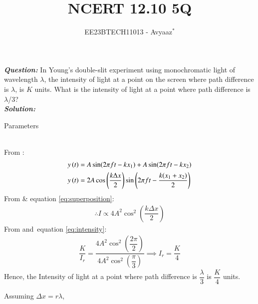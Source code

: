 \documentclass[journal,12pt,twocolumn]{IEEEtran}
\theoremstyle{remark}
\begin{document}

\vspace{3cm}

\title{NCERT 12.10 5Q}
\author{EE23BTECH11013 - Avyaaz$^{*}$%
}
\maketitle
\newpage
\bigskip

\renewcommand{\thefigure}{\arabic{figure}}
\renewcommand{\thetable}{\arabic{table}}

\large\textbf{\textsl{Question:}}
In Young’s double-slit experiment using monochromatic light of wavelength $\lambda$, the intensity of light at a point on the screen where path difference is $\lambda$, is $K$ units. What is the intensity of light at a
point where path difference is $\lambda$/3?\\
\large\textbf{\textsl{Solution:}}
\begin{table}[htbp]
\setlength{\extrarowheight}{8pt}
\centering

\vspace{0.2cm}
\caption{Parameters}
\label{tab:parameters}
\end{table}\\
From :
\begin{align}
y\left(t\right) &= A\sin({2\pi f t - kx_1})  + A\sin({ 2\pi f t - kx_2}) \\
y\left(t\right) &=  2A\cos\left(\dfrac{k\Delta x}{2}\right)\sin\left(2\pi f t - \dfrac{k(x_1+x_2)}{2} \right) \label{eq:superposition}
\end{align}
From  \&  equation \eqref{eq:superposition}: 
\begin{align}
\therefore I \propto 4A^2\cos^2\left(\dfrac{k\Delta x}{2}\right)  \label{eq:intensity}
\end{align}
From  and \,equation \eqref{eq:intensity}: 
\begin{align}
 \dfrac{K}{I_r} = \dfrac{4A^2\cos^2\left(\dfrac{2\pi}{2}\right)}{4A^2\cos^2\left(\dfrac{\pi}{3}\right)}
 \implies I_r = \dfrac{K}{4}
 \end{align}
 Hence, the Intensity of light at a point where path difference is $\dfrac{\lambda}{3}$ is $\dfrac{K}{4}$ units.

\begin{table}[htbp]
\centering

\caption{}
\label{tab:parameters1}
\end{table}
Assuming $\Delta x= r\lambda$, 
\end{document}
